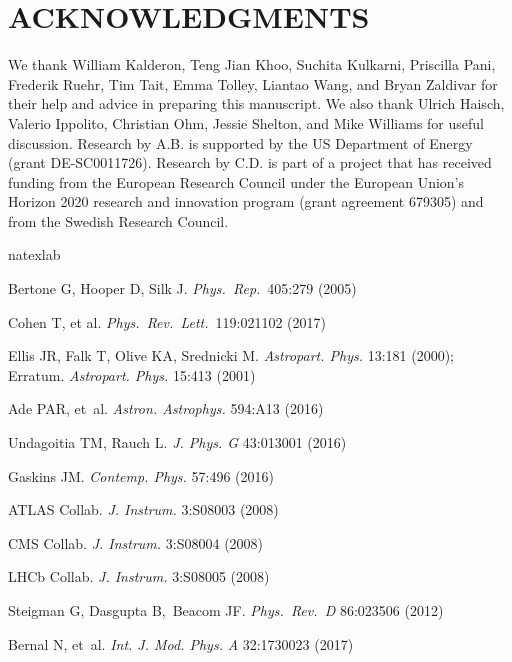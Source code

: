 \documentclass{ar-1col}
\begin{document}
{\section*{ACKNOWLEDGMENTS}

We thank William Kalderon, Teng Jian Khoo, Suchita Kulkarni,
Priscilla Pani, Frederik Ruehr, Tim Tait, Emma Tolley, Liantao Wang, and Bryan Zaldivar
for their help and advice in
preparing this manuscript. We also thank Ulrich Haisch, Valerio
Ippolito, Christian Ohm, Jessie Shelton, and Mike Williams for
useful discussion. Research by A.B. is supported by the US Department of
Energy (grant DE-SC0011726). Research by C.D. is part of a project that
has received funding from the European Research Council
under the European Union's Horizon 2020 research and innovation
program (grant agreement 679305) and from the Swedish
Research Council.
\\

\begin{thebibliography}{175}
\expandafter\ifx\csname
natexlab\endcsname\relax\def\natexlab#1{#1}\fi

Bertone G, Hooper D, Silk J. \textit{Phys.\ Rep.}\  {405}:279 (2005) 

  Cohen T, et al. \textit{Phys.\ Rev.\ Lett.}\  {119}:021102 (2017)
  
Ellis JR, Falk T, Olive KA, Srednicki M. \textit{Astropart. Phys.}
13:181 (2000); Erratum. \textit{Astropart. Phys.} 15:413 (2001)

Ade PAR, et~al. \textit{Astron. Astrophys.} 594:A13 (2016)

Undagoitia TM, Rauch L. \textit{J. Phys. G}
43:013001 (2016)

Gaskins JM. \textit{Contemp. Phys.} 57:496 (2016)

{{ATLAS Collab.}} \textit{{J. Instrum.}} 3:{S08003} (2008)

{{CMS Collab.}} \textit{{J. Instrum.}} 3:{S08004} (2008)

{{LHCb Collab.}} \textit{{J. Instrum.}} 3:{S08005} (2008)

  Steigman G, Dasgupta B,~Beacom JF. \textit{Phys.\ Rev.\ D} {86}:023506 (2012)

Bernal N, et~al. \textit{Int. J. Mod. Phys.} \textit{A} 32:1730023 (2017)


\end{thebibliography}}
\end{document}
